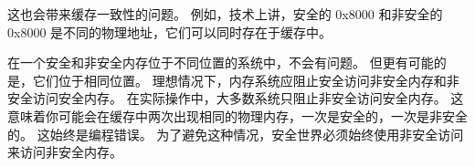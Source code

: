 
这也会带来缓存一致性的问题。
例如，技术上讲，安全的 0x8000 和非安全的 0x8000 是不同的物理地址，它们可以同时存在于缓存中。

在一个安全和非安全内存位于不同位置的系统中，不会有问题。
但更有可能的是，它们位于相同位置。
理想情况下，内存系统应阻止安全访问非安全内存和非安全访问安全内存。
在实际操作中，大多数系统只阻止非安全访问安全内存。
这意味着你可能会在缓存中两次出现相同的物理内存，一次是安全的，一次是非安全的。
这始终是编程错误。
为了避免这种情况，安全世界必须始终使用非安全访问来访问非安全内存。
